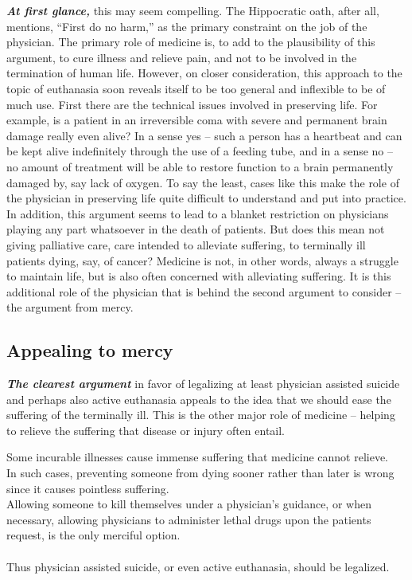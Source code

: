 \documentclass[12pt, openany]{book}
\begin{document}
\textbf{\emph{At first glance,}} this may seem compelling. The Hippocratic oath, after all, mentions, ``First do no harm,'' as the primary constraint on the job of the physician. The primary role of medicine is, to add to the plausibility of this argument, to cure illness and relieve pain, and not to be involved in the termination of human life. However, on closer consideration, this approach to the topic of euthanasia soon reveals itself to be too general and inflexible to be of much use. First there are the technical issues involved in preserving life. For example, is a patient in an irreversible coma with severe and permanent brain damage really even alive? In a sense yes -- such a person has a heartbeat and can be kept alive indefinitely through the use of a feeding tube, and in a sense no -- no amount of treatment will be able to restore function to a brain permanently damaged by, say lack of oxygen. To say the least, cases like this make the role of the physician in preserving life quite difficult to understand and put into practice. In addition, this argument seems to lead to a blanket restriction on physicians playing any part whatsoever in the death of patients. But does this mean not giving palliative care, care intended to alleviate suffering, to terminally ill patients dying, say, of cancer? Medicine is not, in other words, always a struggle to maintain life, but is also often concerned with alleviating suffering. It is this additional role of the physician that is behind the second argument to consider -- the argument from mercy.

\hypertarget{appealing-to-mercy}{%
\subsection*{Appealing to mercy}\label{appealing-to-mercy}}


\textbf{\emph{The clearest argument}} in favor of legalizing at least physician assisted suicide and perhaps also active euthanasia appeals to the idea that we should ease the suffering of the terminally ill. This is the other major role of medicine -- helping to relieve the suffering that disease or injury often entail.

\begin{center}

\begin{argument}

Some incurable illnesses cause immense suffering that medicine cannot relieve.\\
In such cases, preventing someone from dying sooner rather than later is wrong since it causes pointless suffering.\\
Allowing someone to kill themselves under a physician's guidance, or when necessary, allowing physicians to administer lethal drugs upon the patients request, is the only merciful option.\\
~\\
Thus physician assisted suicide, or even active euthanasia, should be legalized.

\end{argument}

\end{center}
\end{document}
